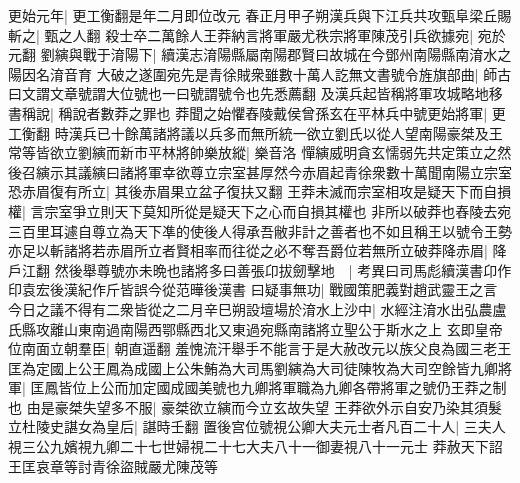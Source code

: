更始元年|{
	更工衡翻是年二月即位改元}
春正月甲子朔漢兵與下江兵共攻甄阜梁丘賜斬之|{
	甄之人翻}
殺士卒二萬餘人王莽納言將軍嚴尤秩宗將軍陳茂引兵欲據宛|{
	宛於元翻}
劉縯與戰于淯陽下|{
	續漢志淯陽縣屬南陽郡賢曰故城在今鄧州南陽縣南淯水之陽因名淯音育}
大破之遂圍宛先是青徐賊衆雖數十萬人訖無文書號令旌旗部曲|{
	師古曰文謂文章號謂大位號也一曰號謂號令也先悉薦翻}
及漢兵起皆稱將軍攻城略地移書稱說|{
	稱說者數莽之罪也}
莽聞之始懼舂陵戴侯曾孫玄在平林兵中號更始將軍|{
	更工衡翻}
時漢兵已十餘萬諸將議以兵多而無所統一欲立劉氏以從人望南陽豪桀及王常等皆欲立劉縯而新市平林將帥樂放縱|{
	樂音洛}
憚縯威明貪玄懦弱先共定策立之然後召縯示其議縯曰諸將軍幸欲尊立宗室甚厚然今赤眉起青徐衆數十萬聞南陽立宗室恐赤眉復有所立|{
	其後赤眉果立盆子復扶又翻}
王莽未滅而宗室相攻是疑天下而自損權|{
	言宗室爭立則天下莫知所從是疑天下之心而自損其權也}
非所以破莽也舂陵去宛三百里耳遽自尊立為天下凖的使後人得承吾敝非計之善者也不如且稱王以號令王勢亦足以斬諸將若赤眉所立者賢相率而往從之必不奪吾爵位若無所立破莽降赤眉|{
	降戶江翻}
然後舉尊號亦未晩也諸將多曰善張卬拔劒擊地　|{
	考異曰司馬彪續漢書卬作印袁宏後漢紀作斤皆誤今從范曄後漢書}
曰疑事無功|{
	戰國策肥義對趙武靈王之言}
今日之議不得有二衆皆從之二月辛巳朔設壇場於淯水上沙中|{
	水經注淯水出弘農盧氏縣攻離山東南過南陽西鄂縣西北又東過宛縣南諸將立聖公于斯水之上}
玄即皇帝位南面立朝羣臣|{
	朝直遥翻}
羞愧流汗舉手不能言于是大赦改元以族父良為國三老王匡為定國上公王鳳為成國上公朱鮪為大司馬劉縯為大司徒陳牧為大司空餘皆九卿將軍|{
	匡鳳皆位上公而加定國成國美號也九卿將軍職為九卿各帶將軍之號仍王莽之制也}
由是豪桀失望多不服|{
	豪桀欲立縯而今立玄故失望}
王莽欲外示自安乃染其須髮立杜陵史諶女為皇后|{
	諶時壬翻}
置後宫位號視公卿大夫元士者凡百二十人|{
	三夫人視三公九嬪視九卿二十七世婦視二十七大夫八十一御妻視八十一元士}
莽赦天下詔王匡哀章等討青徐盜賊嚴尤陳茂等

